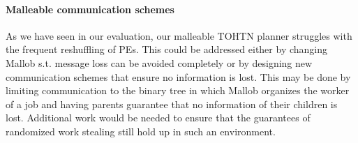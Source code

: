 \begin{comment}
In SAT solving, restarts have long been an important part of solvers to increase their performance.

- we perform restarts according to the harmonic series
- SAT solving already knows restarts, explore inner-outer and luby sequence for potentially better performance

- \cite{langley1992systematic} suggests iterative sampling as an extreme form of restarts
- \cite{crawford1994experimental} uses restarts via iterative sampling for SAT solving
- \cite{gomes1998boosting} use restarts in planning, argue their use in combinatorial search
- \cite{biere2015evaluating}
- optimal restart points may be unknown
- frequent restarts may help in learning
- long times may be needed to find solutions
- show that luby is quite good
- different restart policies:
- static: uniform, geometric, luby
- dynamic: agility - prohibit restart depending on status, 
- \cite{luby1993optimal} propose the luby sequence as a strategy
- \cite{huang2007effect} use luby sequence in SAT
\end{comment}

\paragraph{Malleable communication schemes}
As we have seen in our evaluation, our malleable TOHTN planner struggles with the frequent reshuffling of PEs. This could be addressed either by changing Mallob s.t. message loss can be avoided completely or by designing new communication schemes that ensure no information is lost. This may be done by limiting communication to the binary tree in which Mallob organizes the worker of a job and having parents guarantee that no information of their children is lost. Additional work would be needed to ensure that the guarantees of randomized work stealing still hold up in such an environment.
